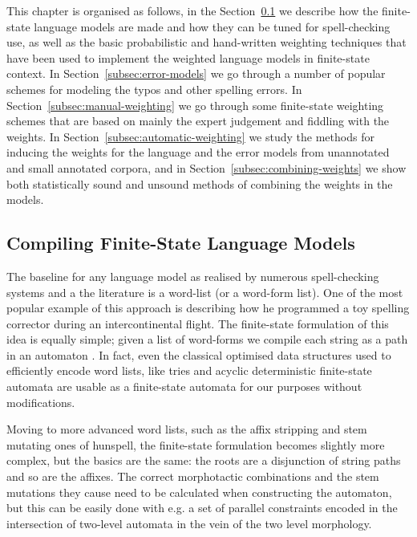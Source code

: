 \documentclass[a4paper,12pt]{article}
\begin{document}
This chapter is organised as follows, in the
Section~\ref{subsec:language-models} we describe how the finite-state language
models are made and how they can be tuned for spell-checking use, as well as
the basic probabilistic and hand-written weighting techniques that have been
used to implement the weighted language models in finite-state context. In
Section~\ref{subsec:error-models} we go through a number of popular schemes for
modeling the typos and other spelling errors.  In
Section~\ref{subsec:manual-weighting} we go through some finite-state weighting
schemes that are based on mainly the expert judgement and fiddling with the
weights.  In Section~\ref{subsec:automatic-weighting} we study the methods for
inducing the weights for the language and the error models from unannotated and
small annotated corpora, and in Section~\ref{subsec:combining-weights} we show
both statistically sound and unsound methods of combining the weights in the
models.

\subsection{Compiling Finite-State Language Models}
\label{subsec:language-models}

The baseline for any language model as realised by numerous
spell-checking systems and a the literature is a word-list (or a word-form
list). One of the most popular example of this approach
is \cite[]{norvig/2010} describing how he programmed a toy spelling corrector
during an intercontinental flight. The finite-state formulation of
this idea is equally simple; given a list of word-forms we compile each string
as a path in an automaton \cite[]{pirinen2012effects}. In fact, even the
classical optimised data structures used to efficiently encode word lists, like
tries and acyclic deterministic finite-state automata are usable as
a finite-state automata for our purposes without modifications.

Moving to more advanced word lists, such as the affix stripping and stem
mutating ones of hunspell, the finite-state formulation becomes slightly more
complex, but the basics are the same: the roots are a disjunction of string
paths and so are the affixes. The correct morphotactic combinations and the
stem mutations they cause need to be calculated when constructing the
automaton, but this can be easily done with e.g. a set of parallel constraints
encoded in the intersection of two-level automata \cite[]{pirinen2010creating}
in the vein of the two level morphology.
\end{document}
